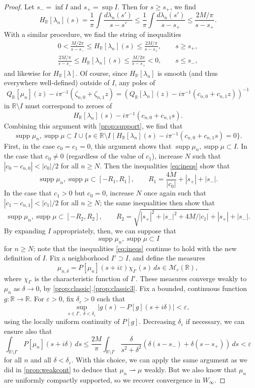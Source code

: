 \documentclass{cams-l} %
\newcommand{\RR}{\mathbb R}
\newcommand{\cM}{\mathcal M}
\newcommand{\eps}{\varepsilon}
\newcommand{\supp}{\operatorname{supp}}
\theoremstyle{definition}
\theoremstyle{remark}
\numberwithin{equation}{section}
\begin{document}
\begin{proof}
    Let $s_- = \inf I$ and $s_+ = \sup I$. Then for $s\geq s_+$, we find
    \[H_\RR[\lambda_n](s) = \frac{1}{\pi}\int\frac{d\lambda_n(s')}{s-s'}\leq \frac{1}{\pi}\int\frac{d\lambda_n(s')}{s-s_+} \leq \frac{2M/\pi}{s-s_+}.\]
    With a similar procedure, we find the string of inequalities
    \begin{equation}\label{eq:ineqs}
        \begin{gathered}
            0<\frac{M/2\pi}{s-s_-}\leq H_\RR[\lambda_n](s) \leq \frac{2M/\pi}{s-s_+},\qquad s\geq s_+,\\
            \frac{2M/\pi}{s-s_-}\leq H_\RR[\lambda_n](s) \leq \frac{M/2\pi}{s-s_+}<0, \qquad s\leq s_-,
        \end{gathered}
    \end{equation}
    and likewise for $H_\RR[\lambda]$. Of course, since $H_\RR[\lambda_n]$ is smooth (and thus everywhere well-defined) outside of $I$, any poles of 
    \[Q_\RR[\mu_n](z) - i\pi^{-1}(\zeta_{n,0} +\zeta_{n,1}z)=\left(Q_\RR[\lambda_n](z) - i\pi^{-1}(c_{n,0} + c_{n,1}z)\right)^{-1}\]
    in $\RR\setminus I$ must correspond to zeroes of \[H_\RR[\lambda_n](s) - i\pi^{-1}(c_{n,0} + c_{n,1}s).\] Combining this argument with \cref{prop:support}, we find that
    \[
        \supp\mu_n,\supp\mu\subset I\cup\{s\in\RR\setminus I\;|\;H_\RR[\lambda_n](s) - i\pi^{-1}(c_{n,0} + c_{n,1}s) = 0\}.
    \]
    First, in the case $c_0=c_1=0$, this argument shows that $\supp\mu_n,\supp\mu\subset I$. In the case that $c_0\neq 0$ (regardless of the value of $c_1$), increase $N$ such that $|c_0-c_{n,0}|<|c_0|/2$ for all $n\geq N$. Then the inequalities \cref{eq:ineqs} show that
    \[\supp\mu_n,\supp\mu\subset[-R_1,R_1],\qquad R_1 = \frac{4M}{|c_0|} +|s_+|+|s_-|.\]
    In the case that $c_1>0$ but $c_0=0$, increase $N$ once again such that $|c_1-c_{n,1}|<|c_1|/2$ for all $n\geq N$; the same inequalities then show that
    \[\supp\mu_n,\supp\mu\subset[-R_2,R_2],\qquad R_2 = \sqrt{|s_+|^2+|s_-|^2+4M/|c_1|}+|s_+|+|s_-|.\]
    By expanding $I$ appropriately, then, we can suppose that
    \[\supp\mu_n,\supp\mu\subset I\]
    for $n\geq N$; note that the inequalities \cref{eq:ineqs} continue to hold with the new definition of $I$. Fix a neighborhood $I'\supset I$, and define the measures
    \[\mu_{n,\delta} = P[\mu_n](s+i\eps)\chi_{I'}(s)\,ds\in\cM_c(\RR),\]
    where $\chi_{I'}$ is the characteristic function of $I'$. These measures converge weakly to $\mu_n$ as $\delta\to 0$, by \cref{prop:classic}.\ref{prop:classic3}. Fix a bounded, continuous function $g:\RR\to\RR$. For $\eps>0$, fix $\delta_\eps>0$ such that 
    \[\sup_{s\in I',\;\delta<\delta_\eps}\left|g(s) - P[g](s+i\delta)\right| < \eps,\]
    using the locally uniform continuity of $P[g]$. Decreasing $\delta_{\eps}$ if necessary, we can ensure also that 
    \[\int_{\RR\setminus I'} P[\mu_n](s+i\delta)\,ds \leq \frac{2M}{\pi}\int_{\RR\setminus I'}\frac{\delta}{s^2+\delta^2}\left(\delta(s-s_-)+\delta(s-s_+)\right)\,ds < \eps \]
    for all $n$ and all $\delta<\delta_\eps$. With this choice, we can apply the same argument as we did in \cref{prop:weakcont} to deduce that $\mu_n\rightharpoonup\mu$ weakly. But we also know that $\mu_n$ are uniformly compactly supported, so we recover convergence in $W_\infty$.
\end{proof}
\end{document}
